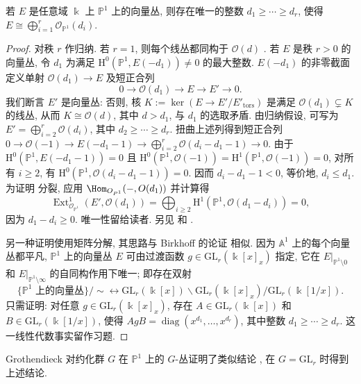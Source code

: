 \begin{theorem}\label{src:9.1.5}
若 $E$ 是任意域 $\Bbbk$ 上 $\mathbb P^1$ 上的向量丛, 则存在唯一的整数 $d_1\geq\cdots\geq d_r$, 使得 $E\cong\bigoplus_{i=1}^r\mathcal O_{\mathbb P^1}(d_i)$.
\end{theorem}
\begin{proof}
对秩 $r$ 作归纳. 若 $r=1$, 则每个线丛都同构于 $\mathcal O(d)$ \cite[命题 II.6.4]{Har77}. 若 $E$ 是秩 $r>0$ 的向量丛, 令 $d_1$ 为满足 $\mathrm H^0(\mathbb P^1,E(-d_1))\ne0$ 的最大整数. $E(-d_1)$ 的非零截面定义单射 $\mathcal O(d_1)\to E$ 及短正合列
\begin{equation}\label{src:9.1.6}
0\to\mathcal O(d_1)\to E\to E'\to0.
\end{equation}
我们断言 $E'$ 是向量丛: 否则, 核 $K:=\ker(E\to E'/E'_{\mathrm{tors}})$ 是满足 $\mathcal O(d_1)\subsetneq K$ 的线丛, 从而 $K\cong\mathcal O(d)$, 其中 $d>d_1$, 与 $d_1$ 的选取矛盾. 由归纳假设, 可写为 $E'=\bigoplus_{i=2}^r\mathcal O(d_i)$, 其中 $d_2\geq\cdots\geq d_r$. 扭曲上述列得到短正合列 $0\to\mathcal O(-1)\to E(-d_1-1)\to\bigoplus_{i=2}^r\mathcal O(d_i-d_1-1)\to0$. 由于 $\mathrm H^0(\mathbb P^1,E(-d_1-1))=0$ 且 $\mathrm H^0(\mathbb P^1,\mathcal O(-1))=\mathrm H^1(\mathbb P^1,\mathcal O(-1))=0$, 对所有 $i\geq2$, 有 $\mathrm H^0(\mathbb P^1,\mathcal O(d_i-d_1-1))=0$. 因而 $d_i-d_1-1<0$, 等价地, $d_i\leq d_1$. 为证明  分裂, 应用 $\Hom_{\mathcal O_{\mathbb P^1}}(-,\mathcal O(d_1))$ 并计算得
\[
\operatorname{Ext}_{\mathcal O_{\mathbb P^1}}^1(E',\mathcal O(d_1))
=\bigoplus_{i\geq2}\mathrm H^1(\mathbb P^1,\mathcal O(d_1-d_i))=0,
\]
因为 $d_1-d_i\geq0$. 唯一性留给读者. 另见 \cite[引理 4.4.1]{LP97} 和 \cite[定理 1.3.1]{HL10}.

另一种证明使用矩阵分解, 其思路与 Birkhoff 的论证 \cite{Bir09} 相似. 因为 $\mathbb A^1$ 上的每个向量丛都平凡, $\mathbb P^1$ 上的向量丛 $E$ 可由过渡函数 $g\in\mathrm{GL}_r(\Bbbk[x]_x)$ 指定, 它在 $E|_{\mathbb P^1\setminus0}$ 和 $E|_{\mathbb P^1\setminus\infty}$ 的自同构作用下唯一; 即存在双射
\[
\{\mathbb P^1\text{ 上的向量丛}\}/{\sim}\longleftrightarrow
\mathrm{GL}_r(\Bbbk[x])\backslash\mathrm{GL}_r(\Bbbk[x]_x)/\mathrm{GL}_r(\Bbbk[1/x]).
\]
只需证明: 对任意 $g\in\mathrm{GL}_r(\Bbbk[x]_x)$, 存在 $A\in\mathrm{GL}_r(\Bbbk[x])$ 和 $B\in\mathrm{GL}_r(\Bbbk[1/x])$, 使得 $AgB=\operatorname{diag}(x^{d_1},\ldots,x^{d_r})$, 其中整数 $d_1\geq\cdots\geq d_r$. 这一线性代数事实留作习题.
\end{proof}
\begin{remark}\label{src:9.1.7}
Grothendieck 对约化群 $G$ 在 $\mathbb P^1$ 上的 $G$-丛证明了类似结论 \cite{Gro57a}, 在 $G=\mathrm{GL}_r$ 时得到上述结论.
\end{remark}
